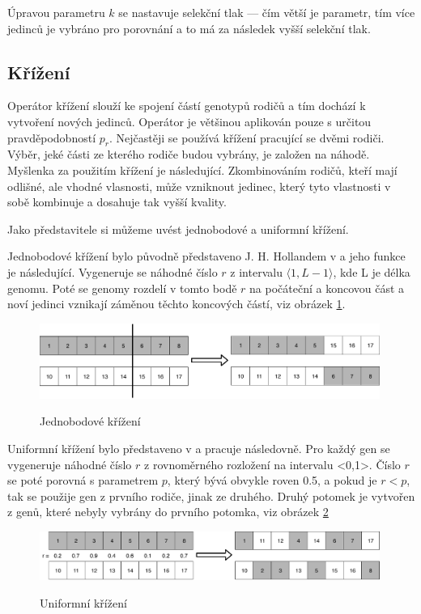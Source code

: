 Úpravou parametru $k$ se nastavuje selekční tlak --- čím větší je parametr, tím více jedinců je vybráno pro porovnání a to má za následek vyšší selekční tlak.

\subsection{Křížení}
Operátor křížení slouží ke spojení částí genotypů rodičů a tím dochází k vytvoření nových jedinců.
Operátor je většinou aplikován pouze s určitou pravděpodobností $p_r$.
Nejčastěji se používá křížení pracující se dvěmi rodiči.
Výběr, jeké části ze kterého rodiče budou vybrány, je založen na náhodě.
Myšlenka za použitím křížení je následující.
Zkombinováním rodičů, kteří mají odlišné, ale vhodné vlasnosti, může vzniknout jedinec, který tyto vlastnosti v sobě kombinuje a dosahuje tak vyšší kvality.

Jako představitele si můžeme uvést jednobodové a uniformní křížení.

Jednobodové křížení bylo původně představeno J. H. Hollandem v  a jeho funkce je následující.
Vygeneruje se náhodné číslo $r$ z intervalu $\langle 1, L-1\rangle$, kde L je délka genomu.
Poté se genomy rozdelí v tomto bodě $r$ na počáteční a koncovou část a noví jedinci vznikají záměnou těchto koncových částí, viz obrázek \ref{fig:jednobodove_krizeni}.

\begin{figure}[h]
    \centering
    {\includegraphics[width=30em]{obrazky-figures/jedobodove_krizeni.pdf}}
    \caption{
    Jednobodové křížení
    }
    \label{fig:jednobodove_krizeni}
\end{figure}

Uniformní křížení bylo představeno v  a pracuje následovně.
Pro každý gen se vygeneruje náhodné číslo $r$ z rovnoměrného rozložení na intervalu <0,1>.
Číslo $r$ se poté porovná s parametrem $p$, který bývá obvykle roven 0.5, a pokud je $r < p$, tak se použije gen z prvního rodiče, jinak ze druhého.
Druhý potomek je vytvořen z genů, které nebyly vybrány do prvního potomka, viz obrázek \ref{fig:uniformni_krizeni}

\begin{figure}[h]
    \centering
    {\includegraphics[width=30em]{obrazky-figures/uniformni_krizeni.pdf}}
    \caption{
    Uniformní křížení
    }
    \label{fig:uniformni_krizeni}
\end{figure}


